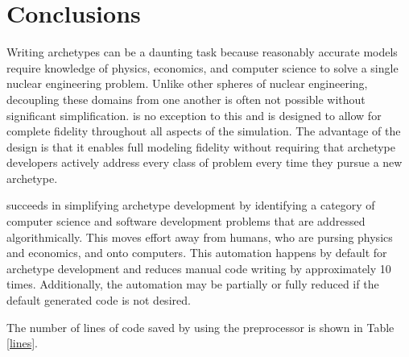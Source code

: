 \section{Conclusions}
\label{sec-conc}

Writing archetypes can be a daunting task because reasonably accurate models 
require knowledge of physics, economics, and computer science to solve a single nuclear engineering 
problem.  Unlike other spheres of nuclear engineering, decoupling these domains from
one another is often not possible without significant simplification. \cyclus is 
no exception to this and is designed to allow for complete fidelity throughout 
all aspects of the simulation. The advantage of the \cyclus design is that it 
enables full modeling fidelity without requiring that archetype developers actively 
address every class of problem every time they pursue a new archetype.

\Cyclus succeeds in simplifying archetype development by identifying a category 
of computer science and software development problems that are addressed 
algorithmically. This moves effort away from humans, who are pursing physics and
economics, and onto computers. This automation happens by default for
archetype development and reduces manual code writing by approximately
10 times.
Additionally, the automation may be partially or fully reduced 
if the default generated code is not desired. 

The number of lines of code saved by using the preprocessor is shown in Table
\ref{lines}.


